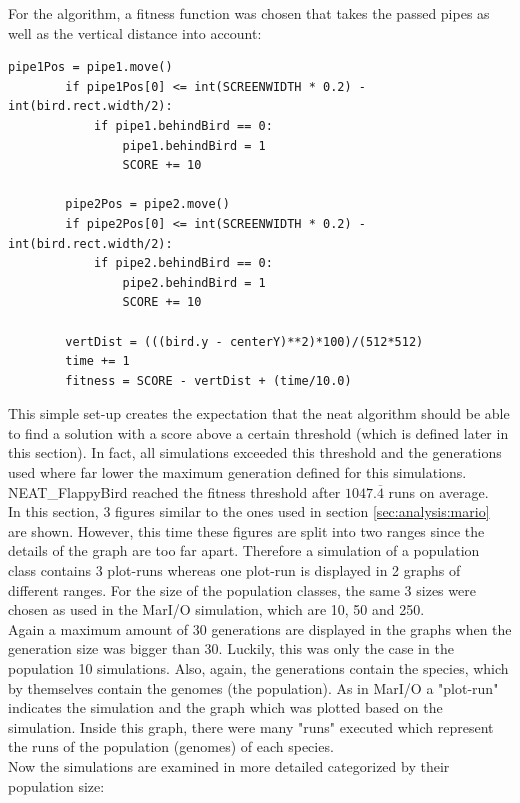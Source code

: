 		For the algorithm, a fitness function was chosen that takes the passed pipes as well as the vertical distance into account: 
		\lstset{style=myPythonstyle} 
		\begin{lstlisting}[basicstyle=\tiny]
		pipe1Pos = pipe1.move()
		if pipe1Pos[0] <= int(SCREENWIDTH * 0.2) - int(bird.rect.width/2):
			if pipe1.behindBird == 0:
				pipe1.behindBird = 1
				SCORE += 10
				
		pipe2Pos = pipe2.move()
		if pipe2Pos[0] <= int(SCREENWIDTH * 0.2) - int(bird.rect.width/2):
			if pipe2.behindBird == 0:
				pipe2.behindBird = 1
				SCORE += 10
				
		vertDist = (((bird.y - centerY)**2)*100)/(512*512)
		time += 1
		fitness = SCORE - vertDist + (time/10.0)
		\end{lstlisting}

		This simple set-up creates the expectation that the \gls{neat} algorithm should be able to find a solution with a score above a certain threshold (which is defined later in this section). In fact, all simulations exceeded this threshold and the generations used where far lower the maximum generation defined for this simulations. NEAT\_FlappyBird reached the fitness threshold after $1047.\overline{4}$ runs on average. \\
		In this section, 3 figures similar to the ones used in section \ref{sec:analysis:mario} are shown. However, this time these figures are split into two ranges since the details of the graph are too far apart. Therefore a simulation of a population class contains 3 plot-runs whereas one plot-run is displayed in 2 graphs of different ranges.  For the size of the population classes, the same 3 sizes were chosen as used in the MarI/O simulation, which are 10, 50 and 250. \\
		Again a maximum amount of 30 generations are displayed in the graphs when the generation size was bigger than 30. Luckily, this was only the case in the population 10 simulations. Also, again, the generations contain the species, which by themselves contain the genomes (the population). 
		As in MarI/O a "plot-run" indicates the simulation and the graph which was plotted based on the simulation. Inside this graph, there were many "runs" executed which represent the runs of the population (genomes) of each species. \\
		Now the simulations are examined in more detailed categorized by their population size:
		
